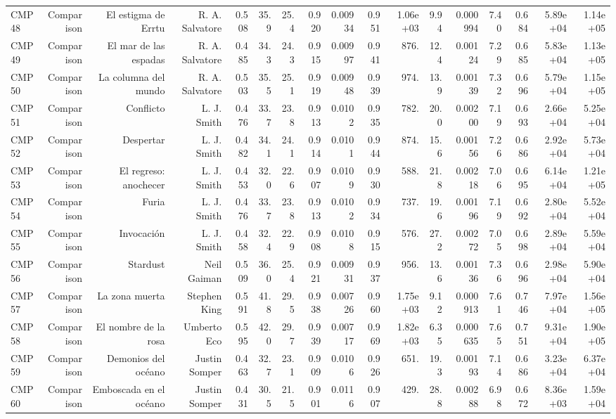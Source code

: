 \begin{table}[htbp]
\begin{tabular}{lrrrrrrrrrrrrrrrr}
CMP48 & Comparison & El estigma de Errtu & R. A. Salvatore & 0.508 & 35.9 & 25.4 & 0.920 & 0.00934 & 0.951 & 1.06e+03 & 9.94 & 0.000994 & 7.40 & 0.684 & 5.89e+04 & 1.14e+05 \\
CMP49 & Comparison & El mar de las espadas & R. A. Salvatore & 0.485 & 34.3 & 24.3 & 0.915 & 0.00997 & 0.941 & 876. & 12.4 & 0.00124 & 7.29 & 0.685 & 5.83e+04 & 1.13e+05 \\
CMP50 & Comparison & La columna del mundo & R. A. Salvatore & 0.503 & 35.5 & 25.1 & 0.919 & 0.00948 & 0.939 & 974. & 13.9 & 0.00139 & 7.32 & 0.696 & 5.79e+04 & 1.15e+05 \\
CMP51 & Comparison & Conflicto & L. J. Smith & 0.476 & 33.7 & 23.8 & 0.913 & 0.0102 & 0.935 & 782. & 20.0 & 0.00200 & 7.19 & 0.693 & 2.66e+04 & 5.25e+04 \\
CMP52 & Comparison & Despertar & L. J. Smith & 0.482 & 34.1 & 24.1 & 0.914 & 0.0101 & 0.944 & 874. & 15.6 & 0.00156 & 7.26 & 0.686 & 2.92e+04 & 5.73e+04 \\
CMP53 & Comparison & El regreso: anochecer & L. J. Smith & 0.453 & 32.0 & 22.6 & 0.907 & 0.0109 & 0.930 & 588. & 21.8 & 0.00218 & 7.06 & 0.695 & 6.14e+04 & 1.21e+05 \\
CMP54 & Comparison & Furia & L. J. Smith & 0.476 & 33.7 & 23.8 & 0.913 & 0.0102 & 0.934 & 737. & 19.6 & 0.00196 & 7.19 & 0.692 & 2.80e+04 & 5.52e+04 \\
CMP55 & Comparison & Invocación & L. J. Smith & 0.458 & 32.4 & 22.9 & 0.908 & 0.0108 & 0.915 & 576. & 27.2 & 0.00272 & 7.05 & 0.698 & 2.89e+04 & 5.59e+04 \\
CMP56 & Comparison & Stardust & Neil Gaiman & 0.509 & 36.0 & 25.4 & 0.921 & 0.00931 & 0.937 & 956. & 13.6 & 0.00136 & 7.36 & 0.696 & 2.98e+04 & 5.90e+04 \\
CMP57 & Comparison & La zona muerta & Stephen King & 0.591 & 41.8 & 29.5 & 0.938 & 0.00726 & 0.960 & 1.75e+03 & 9.12 & 0.000913 & 7.61 & 0.746 & 7.97e+04 & 1.56e+05 \\
CMP58 & Comparison & El nombre de la rosa & Umberto Eco & 0.595 & 42.0 & 29.7 & 0.939 & 0.00717 & 0.969 & 1.82e+03 & 6.35 & 0.000635 & 7.65 & 0.751 & 9.31e+04 & 1.90e+05 \\
CMP59 & Comparison & Demonios del océano & Justin Somper & 0.463 & 32.7 & 23.1 & 0.909 & 0.0106 & 0.926 & 651. & 19.3 & 0.00193 & 7.14 & 0.686 & 3.23e+04 & 6.37e+04 \\
CMP60 & Comparison & Emboscada en el océano & Justin Somper & 0.431 & 30.5 & 21.5 & 0.901 & 0.0116 & 0.907 & 429. & 28.8 & 0.00288 & 6.98 & 0.672 & 8.36e+03 & 1.59e+04 \\

\end{tabular}
\end{table}
